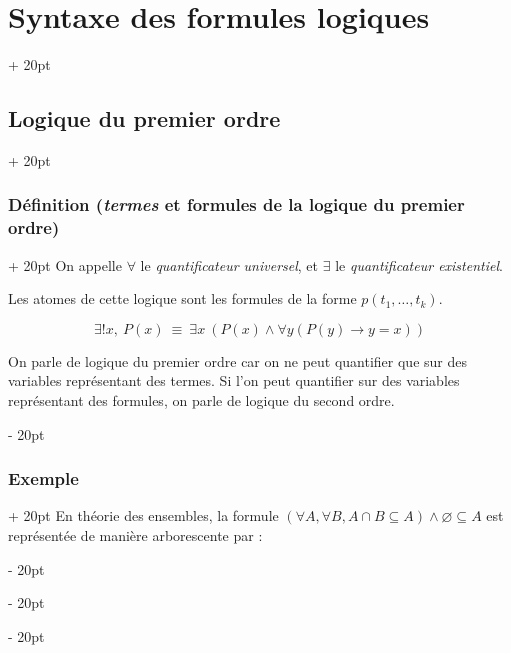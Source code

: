 \documentclass[a4paper, 12pt, twoside]{article}
\newcommand{\ind}[1][20pt]{\advance\leftskip + #1}
\newcommand{\deind}[1][20pt]{\advance\leftskip - #1}
\newenvironment{indt}[2][20pt]{#2 \par \ind[#1]}{\par \deind} %
\begin{document}
\begin{indt}{\section{Syntaxe des formules logiques}}
\begin{indt}{\subsection{Logique du premier ordre}}
\begin{indt}{\subsubsection{Définition (\textit{termes} et formules de la logique du premier ordre)}}
                On appelle $\forall$ le \textit{quantificateur universel}, et $\exists$ le \textit{quantificateur existentiel}.
                
                Les atomes de cette logique sont les formules de la forme $p(t_1, \ldots, t_k)$.
                
                    \[ \exists! x,\ P(x)\ \equiv\ \exists x\ (P(x) \wedge \forall y (P(y) \rightarrow y = x)) \]
                
                On parle de logique du premier ordre car on ne peut quantifier que sur des variables représentant des termes.
                Si l'on peut quantifier sur des variables représentant des formules, on parle de logique du second ordre.
            \end{indt}
            
            \vspace{12pt}
            
            \begin{indt}{\subsubsection{Exemple}}
                En théorie des ensembles, la formule $(\forall A, \forall B, A \cap B \subseteq A) \wedge \varnothing \subseteq A$ est représentée de manière arborescente par :
                \begin{center}
\end{center}
\end{indt}
\end{indt}
\end{indt}
\end{document}
